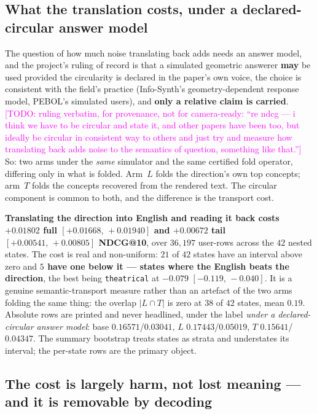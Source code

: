 \documentclass[11pt]{article}
\newcommand{\todo}[1]{\textcolor{magenta}{[TODO: #1]}}
\begin{document}
\subsection{What the translation costs, under a declared-circular answer model}

The question of how much noise translating back adds needs an answer model, and the project's ruling
of record is that a simulated geometric answerer \textbf{may} be used provided the circularity is
declared in the paper's own voice, the choice is consistent with the field's practice (Info-Synth's
geometry-dependent response model, PEBOL's simulated users), and \textbf{only a relative claim is
carried}.\todo{ruling verbatim, for provenance, not for camera-ready: ``re ndcg --- i think we have
to be circular and state it, and other papers have been too, but ideally be circular in consistent
way to others and just try and measure how translating back adds noise to the semantics of question,
something like that.''} So: two arms under the \emph{same} simulator and the same certified fold
operator, differing only in what is folded. Arm~$L$ folds the direction's own top concepts; arm~$T$
folds the concepts recovered from the rendered text. The circular component is common to both, and
the difference is the transport cost.

\textbf{Translating the direction into English and reading it back costs $\mathbf{+0.01802}$ full
$[+0.01668,\,+0.01940]$ and $\mathbf{+0.00672}$ tail $[+0.00541,\,+0.00805]$ NDCG@10}, over
$36{,}197$ user-rows across the $42$ nested states. The cost is real and non-uniform: $21$ of $42$
states have an interval above zero and \textbf{$5$ have one below it --- states where the English
beats the direction}, the best being \texttt{theatrical} at $-0.079$ $[-0.119,\,-0.040]$. It is a
genuine semantic-transport measure rather than an artefact of the two arms folding the same thing:
the overlap $|L \cap T|$ is zero at $38$ of $42$ states, mean $0.19$. Absolute rows are printed and
never headlined, under the label \emph{under a declared-circular answer model}: base
$0.16571$/$0.03041$, $L$ $0.17443$/$0.05019$, $T$ $0.15641$/$0.04347$. The summary bootstrap treats
states as strata and understates its interval; the per-state rows are the primary object.

\subsection{The cost is largely harm, not lost meaning --- and it is removable by decoding}
\end{document}
